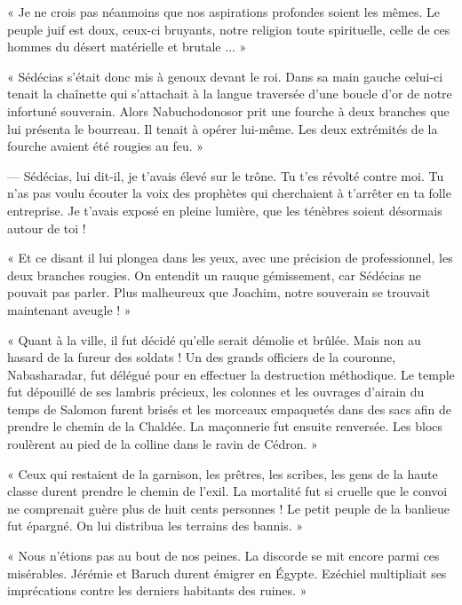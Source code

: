 \documentclass[a4paper, 11pt, oneside, polutonikogreek, french]{article}
\begin{document}
« Je ne crois pas néanmoins que nos aspirations profondes soient les mêmes. Le peuple juif est doux, ceux-ci bruyants, notre religion toute spirituelle, celle de ces hommes du désert matérielle et brutale ... »

« Sédécias s'était donc mis à genoux devant le roi. Dans sa main gauche celui-ci tenait la chaînette qui s'attachait à la langue traversée d'une boucle d'or de notre infortuné souverain. Alors Nabuchodonosor prit une fourche à deux branches que lui présenta le bourreau. Il tenait à opérer lui-même. Les deux extrémités de la fourche avaient été rougies au feu. »

--- Sédécias, lui dit-il, je t'avais élevé sur le trône. Tu t'es révolté contre moi. Tu n'as pas voulu écouter la voix des prophètes qui cherchaient à t'arrêter en ta folle entreprise. Je t'avais exposé en pleine lumière, que les ténèbres soient désormais autour de toi !

« Et ce disant il lui plongea dans les yeux, avec une précision de professionnel, les deux branches rougies. On entendit un rauque gémissement, car Sédécias ne pouvait pas parler. Plus malheureux que Joachim, notre souverain se trouvait maintenant aveugle ! »

\bigskip
\centerline{\EightStarTaper}
\centerline{\EightStarTaper\EightStarTaper}
\bigskip

« Quant à la ville, il fut décidé qu'elle serait démolie et brûlée. Mais non au hasard de la fureur des soldats ! Un des grands officiers de la couronne, Nabasharadar, fut délégué pour en effectuer la destruction méthodique. Le temple fut dépouillé de ses lambris précieux, les colonnes et les ouvrages d'airain du temps de Salomon furent brisés et les morceaux empaquetés dans des sacs afin de prendre le chemin de la Chaldée. La maçonnerie fut ensuite renversée. Les blocs roulèrent au pied de la colline dans le ravin de Cédron. »

« Ceux qui restaient de la garnison, les prêtres, les scribes, les gens de la haute classe durent prendre le chemin de l'exil. La mortalité fut si cruelle que le convoi ne comprenait guère plus de huit cents personnes ! Le petit peuple de la banlieue fut épargné. On lui distribua les terrains des bannis. »

\bigskip
\centerline{\EightStarTaper}
\centerline{\EightStarTaper\EightStarTaper}
\bigskip

« Nous n'étions pas au bout de nos peines. La discorde se mit encore parmi ces misérables. Jérémie et Baruch durent émigrer en Égypte. Ezéchiel multipliait ses imprécations contre les derniers habitants des ruines. »
\end{document}
